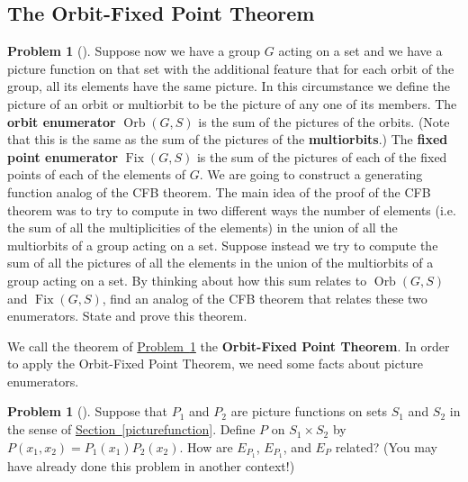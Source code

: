 \documentclass[10pt,]{book}
\newcommand{\terminology}[1]{\textbf{#1}}
\theoremstyle{plain}
\theoremstyle{definition}
\newtheorem{activity}[project]{Problem}
\theoremstyle{definition}
\numberwithin{equation}{chapter}
\DeclareMathOperator{\Fix}{Fix}
\DeclareMathOperator{\Orb}{Orb}
\begin{document}
\subsection[{The Orbit-Fixed Point Theorem}]{The Orbit-Fixed Point Theorem}\label{subsection-68}
\begin{activity}[] \label{orbit-fixed-point-thm}
\hypertarget{p-1743}{}%
Suppose now we have a group \(G\) acting on a set and we have a picture function on that set with the additional feature that for each orbit of the group, all its elements have the same picture. In this circumstance we define the picture of an orbit or multiorbit to be the picture of any one of its members. The \terminology{orbit enumerator} \(\Orb(G,S)\) is the sum of the pictures of the orbits. (Note that this is the same as the sum of the pictures of the \terminology{multiorbits}.) The \terminology{fixed point enumerator} \(\Fix(G, S)\) is the sum of the pictures of each of the fixed points of each of the elements of \(G\). We are going to construct a generating function analog of the CFB theorem. The main idea of the proof of the CFB theorem was to try to compute in two different ways the number of elements (i.e. the sum of all the multiplicities of the elements) in the union of all the multiorbits of a group acting on a set. Suppose instead we try to compute the sum of all the pictures of all the elements in the union of the multiorbits of a group acting on a set. By thinking about how this sum relates to \(\Orb(G,S)\) and \(\Fix(G,S)\), find an analog of the CFB theorem that relates these two enumerators. State and prove this theorem. %
\end{activity}
\hypertarget{p-1745}{}%
We call the theorem of \hyperref[orbit-fixed-point-thm]{Problem~\ref{orbit-fixed-point-thm}} the \terminology{Orbit-Fixed Point Theorem}. In order to apply the Orbit-Fixed Point Theorem, we need some facts about picture enumerators.%
\begin{activity}[] \label{ProdPrincPictureEnumerators}
\hypertarget{p-1746}{}%
Suppose that \(P_1\) and \(P_2\) are picture functions on sets \(S_1\) and \(S_2\) in the sense of \hyperref[picturefunction]{Section~\ref{picturefunction}}. Define \(P\) on \(S_1 \times
S_2\) by \(P(x_1,x_2) = P_1(x_1)P_2(x_2)\). How are \(E_{P_1}\), \(E_{P_1}\), and \(E_{P}\) related? (You may have already done this problem in another context!)%
\end{activity}
\end{document}
